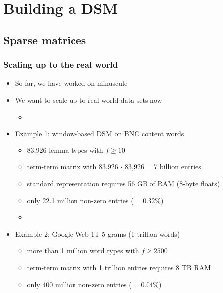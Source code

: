 \documentclass[t]{beamer} %
\begin{document}
\section{Building a DSM}

\subsection{Sparse matrices}

\begin{frame}
  \frametitle{Scaling up to the real world}

  \begin{itemize}
  \item So far, we have worked on minuscule 
  \item[\hand] We want to scale up to \h{real world} data sets now
    \begin{itemize}
    \item[]
    \end{itemize}
  \item<2-> Example 1: window-based DSM on BNC content words
    \begin{itemize}
    \item 83,926 lemma types with $f\geq 10$
    \item term-term matrix with 83,926 $\cdot$ 83,926 = 7 billion entries
    \item standard representation requires 56 GB of RAM (8-byte floats)%
    \item only 22.1 million non-zero entries ($= 0.32\%$)
    \item[]
    \end{itemize}
  \item<3-> Example 2: Google Web 1T 5-grams (1 trillion words)
    \begin{itemize}
    \item more than 1 million word types with $f\geq 2500$
    \item term-term matrix with 1 trillion entries requires 8 TB RAM
    \item only 400 million non-zero entries ($= 0.04\%$)
    \end{itemize}
  \end{itemize}
\end{frame}
\end{document}
